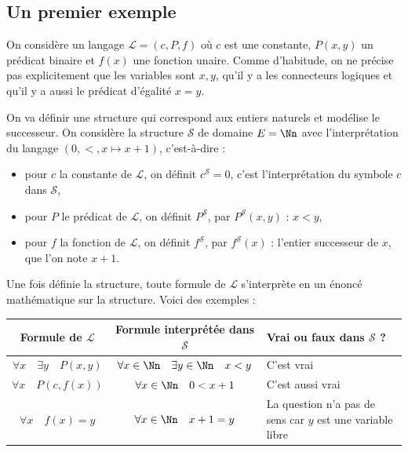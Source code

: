 \documentclass[11pt,class=report,crop=false]{standalone}
\begin{document}
\subsection{Un premier exemple}

On considère un langage $\mathcal{L} = (c, P, f)$ où $c$ est une constante, $P(x,y)$ un prédicat binaire et $f(x)$ une fonction unaire.
Comme d'habitude, on ne précise pas explicitement que les variables sont $x,y$, qu'il y a les connecteurs logiques et qu'il y a aussi le prédicat d'égalité \og{}$x=y$\fg{}.

On va définir une structure qui correspond aux entiers naturels et modélise le successeur.
On considère la structure $\mathcal{S}$ de domaine $E = \Nn$ avec l'interprétation du langage $(0, <, x \mapsto x+1)$, c'est-à-dire :
\begin{itemize}
	\item pour $c$ la constante de $\mathcal{L}$, on définit $c^{\mathcal{S}} = 0$, c'est l'interprétation du symbole $c$ dans $\mathcal{S}$,
	
	\item pour $P$ le prédicat de $\mathcal{L}$, on définit $P^{\mathcal{S}}$, par $P^{\mathcal{S}}(x,y)$ : $x < y$,
	
	\item pour $f$ la fonction de $\mathcal{L}$, on définit $f^{\mathcal{S}}$, par $f^{\mathcal{S}}(x)$ : l'entier successeur de $x$, que l'on note $x+1$.
\end{itemize}

Une fois définie la structure, toute formule de $\mathcal{L}$ s'interprète en un énoncé mathématique sur la structure.
Voici des exemples :

\begin{center}
\begin{tabular}{ccp{5cm}}
Formule de $\mathcal{L}$ & Formule interprétée dans $\mathcal{S}$ & Vrai ou faux dans $\mathcal{S}$ ? \\
\hline

$\forall x \quad \exists y \quad P(x,y)$ & $\forall x \in \Nn \quad \exists y \in \Nn \quad x < y$ & C'est vrai \\

$\forall x \quad P( c, f(x))$ & $\forall x \in \Nn \quad 0 < x+1$ & C'est aussi vrai \\


$\forall x \quad f(x) = y$ & $\forall x \in \Nn \quad x+1 = y$ & La question n'a pas de sens car $y$ est une variable libre \\

\end{tabular}
\end{center}
\end{document}
